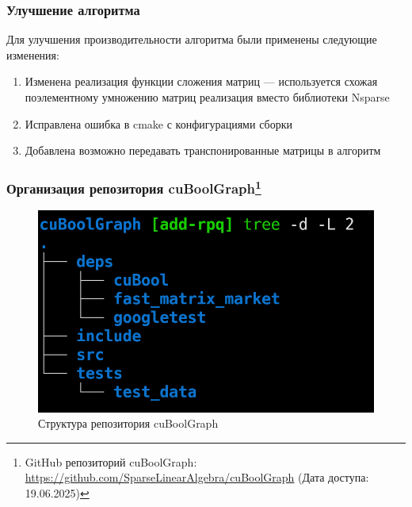 \documentclass[aspectratio=169]{beamer}
\begin{document}
\begin{frame}
  \frametitle{Улучшение алгоритма}
Для улучшения производительности алгоритма были применены следующие изменения:
\begin{enumerate}
    \item Изменена реализация функции сложения матриц --- используется схожая поэлементному умножению матриц реализация вместо библиотеки Nsparse
    \item Исправлена ошибка в cmake с конфигурациями сборки
    \item Добавлена возможно передавать транспонированные матрицы в алгоритм
\end{enumerate}

\begin{table}[]
    \caption{Сравнение времени работы алгоритма до и после изменений}
    \centering
\end{table}

\end{frame}

\begin{frame}
    \frametitle{Организация репозитория cuBoolGraph\footnote{GitHub репозиторий cuBoolGraph: \url{https://github.com/SparseLinearAlgebra/cuBoolGraph} (Дата доступа: 19.06.2025)}}

\begin{figure}
    \centering
    \includegraphics[scale = 0.36]{pictures/cuBoolGraph.png}
    \caption{Структура репозитория cuBoolGraph}
    \label{fig:cuBoolGraph}
\end{figure}

\end{frame}
 
\end{document}
